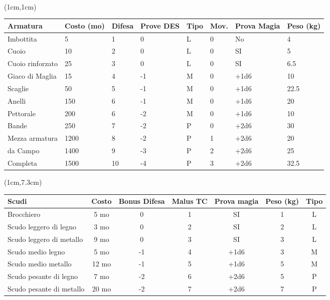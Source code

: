\documentclass[a4paper,12 pt,openany]{book}
\begin{document}
		~\newpage


	\begin{textblock*}{19cm}(1cm,1cm) %

	\begin{tabular}{llllllll}
		\textbf{Armatura} & \textbf{Costo (mo)} & \textbf{Difesa} & \textbf{Prove DES} &  \textbf{Tipo} & \textbf{Mov.} & \textbf{Prova Magia}&\textbf{Peso (kg)}\\
\hline
		Imbottita   & 5    & 1   & 0  &  L   & 0   & No&4\\
		Cuoio   & 10   & 2   & 0   & L   & 0   & SI&5\\
		Cuoio rinforzato   & 25  &3  & 0   &    L   & 0 &SI  & 6.5\\
		Giaco di Maglia   & 15   & 4  & -1  &  M   & 0  &+1d6 & 10\\
		Scaglie& 50   & 5  & -1  &  M   & 0 &+1d6  & 22.5\\
		Anelli & 150  & 6  & -1  &  M   & 0  &+1d6 & 20\\
		Pettorale    & 200  & 6  & -2  &  M  &  0 &+1d6  & 10\\
		Bande   & 250  & 7  & -2  &  P   & 0  &+2d6 & 30\\
		Mezza armatura   & 1200 & 8  & -2  &  P   & 1 &+2d6  & 20\\
		da Campo& 1400 & 9 & -3  &   P   & 2  &+2d6 & 25\\
		Completa& 1500 & 10  & -4  & P   & 3  &+2d6 & 32.5\\
	\end{tabular}
\end{textblock*}

		\begin{textblock*}{19cm}(1cm,7.3cm) %
\begin{tabular}{lcccccc}
	\textbf{Scudi} & \textbf{Costo} & \textbf{Bonus Difesa} & \textbf{Malus TC} & \textbf{Prova magia} & \textbf{Peso (kg)} & \textbf{Tipo}\\
\hline
	Brocchiero& 5 mo  &  0& 1& SI&1  & L\\
	Scudo leggero di legno   & 3 mo  &  0& 2& SI&2  & L\\
	Scudo leggero di metallo & 9  mo  &  0& 3&SI& 3  & L\\
	Scudo medio legno   & 5 mo   &  -1& 4& +1d6&3  & M\\
	Scudo medio metallo & 12 mo  & -1  & 5& +1d6&5  & M\\
	Scudo pesante di legno   & 7  mo  &  -2    & 6& +2d6&5  & P\\
	Scudo pesante di metallo & 20 mo  &  -2    & 7& +2d6&7  & P\\
\end{tabular}
\end{textblock*}
\end{document}

